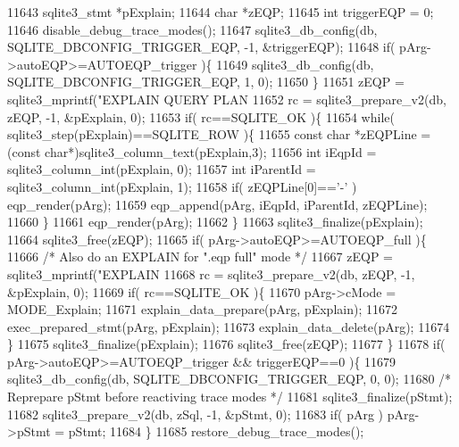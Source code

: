 \begin{DoxyCode}
{11643         sqlite3_stmt *pExplain;
11644         \textcolor{keywordtype}{char} *zEQP;
11645         \textcolor{keywordtype}{int} triggerEQP = 0;
11646         disable_debug_trace_modes();
11647         sqlite3_db_config(db, SQLITE_DBCONFIG_TRIGGER_EQP, -1, &triggerEQP);
11648         \textcolor{keywordflow}{if}( pArg->autoEQP>=AUTOEQP_trigger )\{
11649           sqlite3_db_config(db, SQLITE_DBCONFIG_TRIGGER_EQP, 1, 0);
11650         \}
11651         zEQP = sqlite3_mprintf(\textcolor{stringliteral}{"EXPLAIN QUERY PLAN %
11652         rc = sqlite3_prepare_v2(db, zEQP, -1, &pExplain, 0);
11653         \textcolor{keywordflow}{if}( rc==SQLITE_OK )\{
11654           \textcolor{keywordflow}{while}( sqlite3_step(pExplain)==SQLITE_ROW )\{
11655             \textcolor{keyword}{const} \textcolor{keywordtype}{char} *zEQPLine = (\textcolor{keyword}{const} \textcolor{keywordtype}{char}*)sqlite3_column_text(pExplain,3);
11656             \textcolor{keywordtype}{int} iEqpId = sqlite3_column_int(pExplain, 0);
11657             \textcolor{keywordtype}{int} iParentId = sqlite3_column_int(pExplain, 1);
11658             \textcolor{keywordflow}{if}( zEQPLine[0]==\textcolor{charliteral}{'-'} ) eqp_render(pArg);
11659             eqp_append(pArg, iEqpId, iParentId, zEQPLine);
11660           \}
11661           eqp_render(pArg);
11662         \}
11663         sqlite3_finalize(pExplain);
11664         sqlite3_free(zEQP);
11665         \textcolor{keywordflow}{if}( pArg->autoEQP>=AUTOEQP_full )\{
11666           \textcolor{comment}{/* Also do an EXPLAIN for ".eqp full" mode */}
11667           zEQP = sqlite3_mprintf(\textcolor{stringliteral}{"EXPLAIN %
11668           rc = sqlite3_prepare_v2(db, zEQP, -1, &pExplain, 0);
11669           \textcolor{keywordflow}{if}( rc==SQLITE_OK )\{
11670             pArg->cMode = MODE_Explain;
11671             explain_data_prepare(pArg, pExplain);
11672             exec_prepared_stmt(pArg, pExplain);
11673             explain_data_delete(pArg);
11674           \}
11675           sqlite3_finalize(pExplain);
11676           sqlite3_free(zEQP);
11677         \}
11678         \textcolor{keywordflow}{if}( pArg->autoEQP>=AUTOEQP_trigger && triggerEQP==0 )\{
11679           sqlite3_db_config(db, SQLITE_DBCONFIG_TRIGGER_EQP, 0, 0);
11680           \textcolor{comment}{/* Reprepare pStmt before reactiving trace modes */}
11681           sqlite3_finalize(pStmt);
11682           sqlite3_prepare_v2(db, zSql, -1, &pStmt, 0);
11683           \textcolor{keywordflow}{if}( pArg ) pArg->pStmt = pStmt;
11684         \}
11685         restore_debug_trace_modes();
}}}
\end{DoxyCode}

